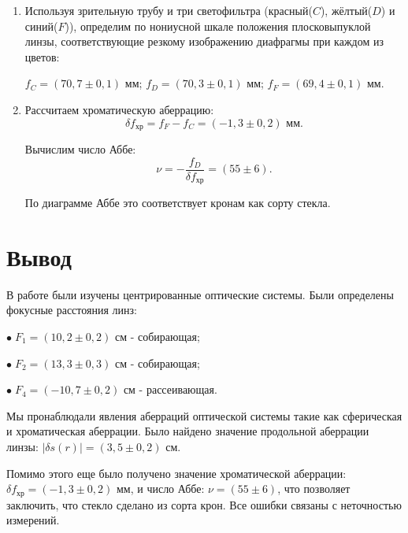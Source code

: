 \documentclass[a4paper,12pt]{article} %
\begin{document}
	\begin{enumerate}
		\item Используя зрительную трубу и три светофильтра (красный($C$), жёлтый($D$) и синий($F$)), определим по нониусной шкале положения плосковыпуклой линзы, соответствующие резкому изображению диафрагмы при каждом из цветов:
		
		$f_C = (70,7 \pm 0,1)$ мм; $f_D = (70,3 \pm 0,1)$ мм; $f_F = (69,4 \pm 0,1)$ мм.
	
		\item Рассчитаем хроматическую аберрацию:
		\begin{equation*}
			\delta f_{\text{хр}} = f_F - f_C = (-1,3 \pm 0,2) \text{ мм}.
		\end{equation*}
	
		Вычислим число Аббе:
		\begin{equation*}
			\nu = -\frac{f_D}{\delta f_{\text{хр}}} = (55 \pm 6).
		\end{equation*}
	
		По диаграмме Аббе это соответствует кронам как сорту стекла.
	\end{enumerate}
	
	
	\section*{Вывод}
	В работе были изучены центрированные оптические системы. Были определены фокусные расстояния линз:
	
	$\bullet \; F_1 = (10,2 \pm 0,2)$ см - собирающая;

	$\bullet \; F_2 = (13,3 \pm 0,3)$ см - собирающая;

	$\bullet \; F_4 = (-10,7 \pm 0,2)$ см - рассеивающая.
	
	Мы пронаблюдали явления аберраций оптической системы такие как сферическая и хроматическая аберрации. Было найдено значение продольной аберрации линзы: $|\delta s(r)| = (3,5 \pm 0,2)$ см.
	
	Помимо этого еще было получено значение хроматической аберрации: $\delta f_{\text{хр}} = (-1,3 \pm 0,2)$ мм, и число Аббе: $\nu = (55 \pm 6)$, что позволяет заключить, что стекло сделано из сорта крон. Все ошибки связаны с неточностью измерений.
\end{document}
